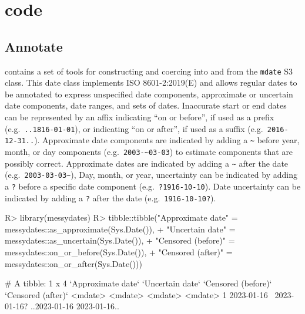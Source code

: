 \documentclass[
]{jss}
\begin{document}
\section[R code]{ code}\label{r-code}

\hypertarget{annotate}{%
\subsection{Annotate}\label{annotate}}

 contains a set of tools for constructing and coercing
into and from the \texttt{mdate} S3 class. This date class implements
ISO 8601-2:2019(E) and allows regular dates to be annotated to express
unspecified date components, approximate or uncertain date components,
date ranges, and sets of dates. Inaccurate start or end dates can be
represented by an affix indicating ``on or before'', if used as a prefix
(e.g.~\texttt{..1816-01-01}), or indicating ``on or after'', if used as
a suffix (e.g.~\texttt{2016-12-31..}). Approximate date components are
indicated by adding a \texttt{\textasciitilde{}} before year, month, or
day components (e.g.~\texttt{2003-\textasciitilde{}03-03}) to estimate
components that are possibly correct. Approximate dates are indicated by
adding a \texttt{\textasciitilde{}} after the date
(e.g.~\texttt{2003-03-03\textasciitilde{}}), Day, month, or year,
uncertainty can be indicated by adding a \texttt{?} before a specific
date component (e.g.~\texttt{?1916-10-10}). Date uncertainty can be
indicated by adding a \texttt{?} after the date
(e.g.~\texttt{1916-10-10?}).

\begin{CodeChunk}
\begin{CodeInput}
R> library(messydates)
R> tibble::tibble("Approximate date" = messydates::as_approximate(Sys.Date()), 
+                "Uncertain date" = messydates::as_uncertain(Sys.Date()),
+                "Censored (before)" = messydates::on_or_before(Sys.Date()),
+                "Censored (after)" = messydates::on_or_after(Sys.Date()))
\end{CodeInput}
\begin{CodeOutput}
# A tibble: 1 x 4
  `Approximate date` `Uncertain date` `Censored (before)` `Censored (after)`
  <mdate>            <mdate>          <mdate>             <mdate>           
1 2023-01-16~        2023-01-16?      ..2023-01-16        2023-01-16..      
\end{CodeOutput}
\end{CodeChunk}
\end{document}
